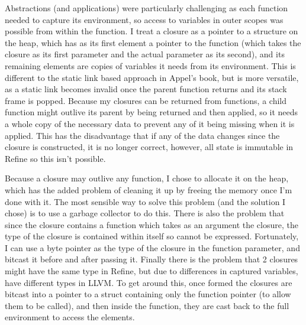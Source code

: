 Abstractions (and applications) were particularly challenging as each function needed to capture its
environment, so access to variables in outer scopes was possible from within the function.
I treat a closure as a pointer to a structure on the heap, which has as its first element a pointer
to the function (which takes the closure as its first parameter and the actual parameter as its second),
and its remaining elements are copies of variables it needs from its environment.
This is different to the static link based approach in Appel's book, but is more versatile, as a
static link becomes invalid once the parent function returns and its stack frame is popped.
Because my closures can be returned from functions, a child function might outlive its parent by being
returned and then applied, so it needs a whole copy of the necessary data to prevent any of it being
missing when it is applied.
This has the disadvantage that if any of the data changes since the closure is constructed, it is no longer
correct, however, all state is immutable in Refine so this isn't possible.

Because a closure may outlive any function, I chose to allocate it on the heap, which has the added problem
of cleaning it up by freeing the memory once I'm done with it.
The most sensible way to solve this problem (and the solution I chose) is to use a garbage collector to do this.
There is also the problem that since the closure contains a function which takes as an argument the closure,
the type of the closure is contained within itself so cannot be expressed.
Fortunately, I can use a byte pointer as the type of the closure in the function parameter, and bitcast it
before and after passing it.
Finally there is the problem that 2 closures might have the same type in Refine, but due to differences
in captured variables, have different types in LLVM.
To get around this, once formed the closures are bitcast into a pointer to a struct containing only the
function pointer (to allow them to be called), and then inside the function, they are cast back to
the full environment to access the elements.

